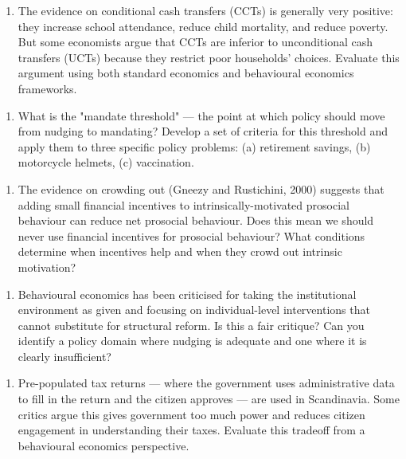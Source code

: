 \documentclass[12pt, letterpaper]{article}
\begin{document}
\begin{enumerate}
\item The evidence on conditional cash transfers (CCTs) is generally very positive: they increase school attendance, reduce child mortality, and reduce poverty. But some economists argue that CCTs are inferior to unconditional cash transfers (UCTs) because they restrict poor households' choices. Evaluate this argument using both standard economics and behavioural economics frameworks.
\end{enumerate}

\begin{enumerate}
\item What is the "mandate threshold" --- the point at which policy should move from nudging to mandating? Develop a set of criteria for this threshold and apply them to three specific policy problems: (a) retirement savings, (b) motorcycle helmets, (c) vaccination.
\end{enumerate}

\begin{enumerate}
\item The evidence on crowding out (Gneezy and Rustichini, 2000) suggests that adding small financial incentives to intrinsically-motivated prosocial behaviour can reduce net prosocial behaviour. Does this mean we should never use financial incentives for prosocial behaviour? What conditions determine when incentives help and when they crowd out intrinsic motivation?
\end{enumerate}

\begin{enumerate}
\item Behavioural economics has been criticised for taking the institutional environment as given and focusing on individual-level interventions that cannot substitute for structural reform. Is this a fair critique? Can you identify a policy domain where nudging is adequate and one where it is clearly insufficient?
\end{enumerate}

\begin{enumerate}
\item Pre-populated tax returns --- where the government uses administrative data to fill in the return and the citizen approves --- are used in Scandinavia. Some critics argue this gives government too much power and reduces citizen engagement in understanding their taxes. Evaluate this tradeoff from a behavioural economics perspective.
\end{enumerate}
\end{document}
